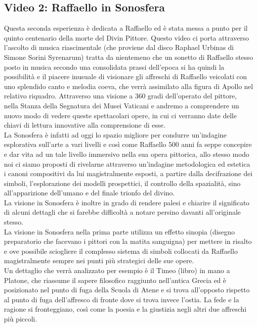 \documentclass[hidelinks,12pt,a4paper]{article}
\begin{document}
\begin{flushleft}
			\subsection{Video 2: Raffaello in Sonosfera}
			Questa seconda esperienza è dedicata a Raffaello ed è stata messa a punto per il quinto centenario della morte del Divin Pittore. Questo video ci porta attraverso l'ascolto di musica riascimentale (che proviene dal disco Raphael Urbinas di Simone Sorini Syrenarum) tratta da nientemeno che un sonetto di Raffaello stesso posto in musica secondo una consolidata prassi dell'epoca si ha quindi la possibilità e il piacere inusuale di  visionare gli affreschi di Raffaello veicolati con uno splendido canto e melodia coeva, che verrà assimilato alla figura di Apollo nel relativo riquadro.  Attraverso una visione a 360 gradi dell'operato del pittore, nella Stanza della Segnatura dei Musei Vaticani e andremo a comprendere un nuovo modo di vedere queste spettacolari opere, in cui ci verranno date delle chiavi di lettura innovative alla comprensione di esse.\\
			La Sonosfera è infatti ad oggi lo spazio migliore per condurre un'indagine esplorativa sull'arte a vari livelli e così come Raffaello 500 anni fa seppe concepire e dar vita ad un tale livello immersivo nella sua opera pittorica, allo stesso modo noi ci siamo proposti di rivelarne attraverso un'indagine metodologica ed estetica i canoni compositivi da lui magistralmente esposti, a partire dalla decifrazione dei simboli, l'esplorazione dei modelli prospettici, il controllo della spazialità, sino all'apparizione dell'umano e del finale trionfo del divino.\\
			La visione in Sonosfera è inoltre in grado di rendere palesi e chiarire il significato di alcuni dettagli che si farebbe difficoltà a notare persino davanti all'originale stesso.\\
			La visione in Sonosfera  nella prima parte utilizza un effetto sinopia (disegno preparatorio che facevano i pittori con la matita sanguigna) per mettere in risalto e ove possibile sciogliere il complesso sistema di simboli collocati da Raffaello magistralmente sempre nei punti più strategici delle sue opere.\\
			Un dettaglio che verrà analizzato per esempio è il Timeo (libro) in mano a Platone, che riassume il sapere filosofico raggiunto nell'antica Grecia ed è posizionato nel punto di fuga della Scuola di Atene e si trova all'opposto rispetto al punto di fuga dell'affresco di fronte dove si trova invece l'ostia. La fede e la ragione si fronteggiano, così come la poesia e la giustizia negli altri due affreschi più piccoli.\\

\end{flushleft}
\end{document}
